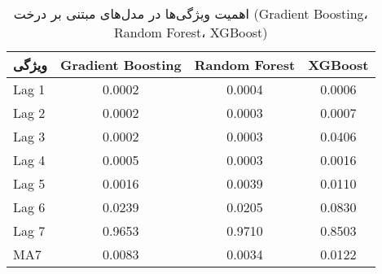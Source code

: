 
    \begin{table}[h]
        \centering
        \begin{tabular}{lccc}
            \toprule
            \textbf{ویژگی} & \textbf{Gradient Boosting} & \textbf{Random Forest} & \textbf{XGBoost} \\
            \midrule
            Lag 1 & 0.0002 & 0.0004 & 0.0006 \\
        Lag 2 & 0.0002 & 0.0003 & 0.0007 \\
        Lag 3 & 0.0002 & 0.0003 & 0.0406 \\
        Lag 4 & 0.0005 & 0.0003 & 0.0016 \\
        Lag 5 & 0.0016 & 0.0039 & 0.0110 \\
        Lag 6 & 0.0239 & 0.0205 & 0.0830 \\
        Lag 7 & 0.9653 & 0.9710 & 0.8503 \\
        MA7 & 0.0083 & 0.0034 & 0.0122 \\

            \bottomrule
        \end{tabular}
        \caption{اهمیت ویژگی‌ها در مدل‌های مبتنی بر درخت (Gradient Boosting، Random Forest، XGBoost)}
        \label{tab:feature_importance}
    \end{table}
    